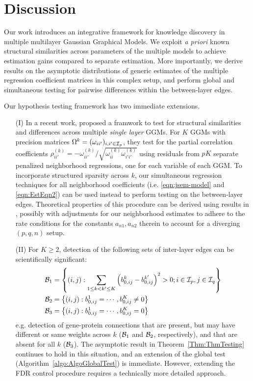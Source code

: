 \section{Discussion}
Our work introduces an integrative framework for knowledge discovery in multiple multilayer Gaussian Graphical Models. We exploit {\it a priori} known structural similarities across parameters of the multiple models to achieve estimation gains compared to separate estimation. More importantly, we derive results on the asymptotic distributions of generic estimates of the multiple regression coefficient matrices in this complex setup, and perform global and simultaneous testing for pairwise differences within the between-layer edges.

Our hypothesis testing framework has two immediate extensions.

\begin{itemize}
\item[(I)] In a recent work, \cite{Liu17} proposed a framwork to test for structural similarities and differences across multiple {\it single layer} GGMs. For $K$ GGMs with precision matrices $\Omega^k = (\omega_{ii'})_{i,i' \in {\cal{I}}_p}$, they test for the partial correlation coefficients $\rho_{ii'}^{(k)} = - \omega_{ii'}^{(k)} / \sqrt{\omega_{ii}^{(k)} \omega_{i'i'}^{(k)}}$ using residuals from $pK$ separate penalized neighborhood regressions, one for each variable of each GGM. To incorporate structured sparsity across $k$, our simultaneous regression techniques for all neighborhood coefficients (i.e. \eqref{eqn:jsem-model} and \eqref{eqn:EstEqn2}) can be used instead to perform testing on the between-layer edges. Theoretical properties of this procedure can be derived using results in \cite{Liu17}, possibly with adjustments for our neighborhood estimates to adhere to the rate conditions for the constants $a_{n1}, a_{n2}$ therein to account for a diverging $(p,q,n)$ setup.

\item[(II)] For $K \geq 2$, detection of the following sets of inter-layer edges can be scientifically significant:
%
\begin{align*}
{\cal{B}}_1 &= \left\{ (i,j): \sum_{1 \leq k < k' \leq K} \left(b_{0,ij}^k - b_{0,ij}^{k'} \right)^2 > 0; i \in {\cal{I}}_p, j \in {\cal{I}}_q \right\}\\
{\cal{B}}_2 &= \left\{ (i,j): b_{0,ij}^1 = \cdots, b_{0,ij}^K \neq 0 \right\}\\
{\cal{B}}_3 &= \left\{ (i,j): b_{0,ij}^1 = \cdots, b_{0,ij}^K = 0 \right\}
\end{align*}
%
e.g. detection of gene-protein connections that are present, but may have different or same weights across $k$ (${\cal{B}}_1$ and ${\cal{B}}_2$, respectively), and that are absent for all $k$ (${\cal{B}}_3$). The asymptotic result in Theorem~\ref{Thm:ThmTesting} continues to hold in this situation, and an extension of the global test (Algorithm~\ref{algo:AlgoGlobalTest}) is immediate. However, extending the FDR control procedure requires a technically more detailed approach.
\end{itemize}

